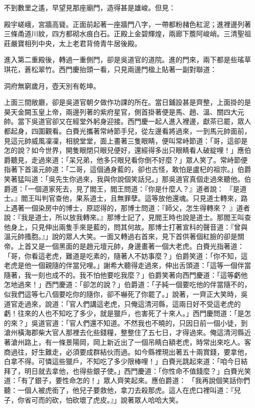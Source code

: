 不到數里之遙，早望見那座廟門，造得甚是雄峻。但見：

殿宇嵯峨，宮牆高聳。正面前起著一座牆門八字，一帶都粉赭色紅泥；進裡邊列著三條甬道川紋，四方都砌水痕白石。正殿上金碧輝煌，兩廊下簷阿峻峭。三清聖祖莊嚴寶相列中央，太上老君背倚青牛居後殿。

進入第二重殿後，轉過一重側門，卻是吳道官的道院。進的門來，兩下都是些瑤草琪花，蒼松翠竹。西門慶抬頭一看，只見兩邊門楹上貼著一副對聯道：

洞府無窮歲月，壺天別有乾坤。

上面三間敞廳，卻是吳道官朝夕做作功課的所在。當日鋪設甚是齊整，上面掛的是昊天金闕玉皇上帝，兩邊列著的紫府星官，側首掛著便是馬、趙、溫、關四大元帥。當下吳道官卻又在經堂外躬身迎接。西門慶一起人進入裡邊，獻茶已罷，眾人都起身，四圍觀看。白賚光攜著常峙節手兒，從左邊看將過來，一到馬元帥面前，見這元帥威風凜凜，相貌堂堂，面上畫著三隻眼睛，便叫常峙節道：「哥，這卻是怎的說？如今世界，開隻眼閉只眼兒便好，還經得多出只眼睛看人破綻哩！」應伯爵聽見，走過來道：「呆兄弟，他多只眼兒看你倒不好麼？」眾人笑了。常峙節便指著下首溫元帥道：「二哥，這個通身藍的，卻也古怪，敢怕是盧杞的祖宗。」伯爵笑著猛叫道：「吳先生你過來，我與你說個笑話兒。」那吳道官真個走過來聽他。伯爵道：「一個道家死去，見了閻王，閻王問道：『你是什麼人？』道者說： 『是道士。』閻王叫判官查他，果系道士，且無罪孽。這等放他還魂。只見道士轉來，路上遇著一個染房中的博士，原認得的，那博士問道：『師父，怎生得轉來？ 』道者說：『我是道士，所以放我轉來。』那博士記了，見閻王時也說是道士。那閻王叫查他身上，只見伸出兩隻手來是藍的，問其何故。那博士打著宣科的聲音道：『曾與溫元帥搔胞。』」說的眾人大笑。一面又轉過右首來，見下首供著個紅臉的卻是關帝。上首又是一個黑面的是趙元壇元帥，身邊畫著一個大老虎。白賚光指著道：「哥，你看這老虎，難道是吃素的，隨著人不妨事麼？」伯爵笑道：「你不知，這老虎是他一個親隨的伴當兒哩。」謝希大聽得走過來，伸出舌頭道：「這等一個伴當隨著，我一刻也成不的。我不怕他要吃我麼？」伯爵笑著向西門慶道：「這等虧他怎地過來！」西門慶道：「卻怎的說？」伯爵道：「子純一個要吃他的伴當隨不的，似我們這等七八個要吃你的隨你，卻不嚇死了你罷了。」說著，一齊正大笑時，吳道官走過來，說道：「官人們講這老虎，只俺這清河縣，這兩日好不受這老虎的虧！往來的人也不知吃了多少，就是獵戶，也害死了十來人。」西門慶問道：「是怎的來？」吳道官道：「官人們還不知道。不然我也不曉的，只因日前一個小徒，到滄州橫海郡柴大官人那裡去化些錢糧，整整住了五七日，才得過來。俺這清河縣近著滄州路上，有一條景陽岡，岡上新近出了一個吊睛白額老虎，時常出來吃人。客商過往，好生難走，必須要成群結伙而過。如今縣裡現出著五十兩賞錢，要拿他，白拿不得。可憐這些獵戶，不知吃了多少限棒哩！」白賚光跳起來道：「咱今日結拜了，明日就去拿他，也得些銀子使。」西門慶道：「你性命不值錢麼？」白賚光笑道：「有了銀子，要性命怎的！」眾人齊笑起來。應伯爵道： 「我再說個笑話你們聽：一個人被虎銜了，他兒子要救他，拿刀去殺那虎。這人在虎口裡叫道：『兒子，你省可而的砍，怕砍壞了虎皮。』」說著眾人哈哈大笑。

